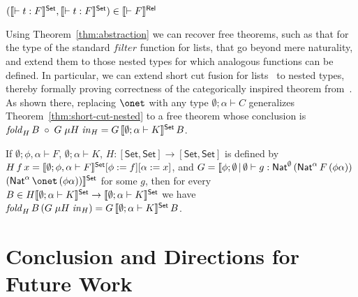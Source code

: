 \documentclass[runningheads]{llncs}
\newcommand{\set}{\mathsf{Set}}
\begin{document}
\begin{theorem}\label{thm:abstraction}
  $(\setsem{\vdash t : F},\setsem{\vdash t
  : F}) \in \relsem{\vdash F}$
\end{theorem}

Using Theorem~\ref{thm:abstraction} we can recover free theorems, such
as that for the type of the standard $\mathit{filter}$ function for
lists, that go beyond mere naturality, and extend them to those nested
types for which analogous functions can be defined. In particular, we
can extend short cut fusion for lists~\cite{glp93} to nested types,
thereby formally proving correctness of the categorically inspired
theorem from~\cite{jg10}. As shown there, replacing $\onet$ with any
type $\emptyset;\alpha \vdash C$ generalizes
Theorem~\ref{thm:short-cut-nested} to a free theorem whose conclusion
is $\mathit{fold}_{H}\, B \; \circ \; G\; \mu H \; \mathit{in}_{H} = G
\,\setsem{\emptyset;\alpha \vdash K}\, B$.
\begin{theorem}\label{thm:short-cut-nested}
If $\emptyset;\phi,\alpha \vdash F$, $\emptyset; \alpha
\vdash K$, 
$H : [\set,\set] \to [\set,\set]$ is defined by $H\,f\,x =
\setsem{\emptyset; \phi, \alpha \vdash F}[\phi := f][\alpha := x]$,
and $G = \llbracket \phi;\emptyset\,|\,\emptyset \vdash g :
\mathsf{Nat}^\emptyset\,(\mathsf{Nat}^\alpha\,F\,(\phi\alpha))$ \\
\noindent $(\Nat^\alpha\,\onet \, (\phi\alpha)) \rrbracket^\set$ for
some $g$, then for every $B \in H \setsem{\emptyset;\alpha \vdash K}
\rightarrow \setsem{\emptyset; \alpha \vdash K}$ we have
$\mathit{fold}_{H}\, B \, (G\; \mu H \; \mathit{in}_{H}) = G
\,\setsem{\emptyset;\alpha \vdash K}\, B$.
\end{theorem}

\vspace*{-0.15in}

\section{Conclusion and Directions for Future Work}\label{sec:conclusion}

\vspace*{-0.08in}
\end{document}
